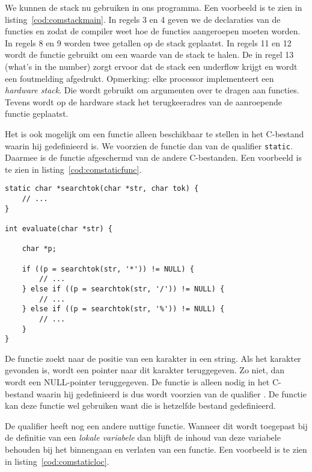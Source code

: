 We kunnen de stack nu gebruiken in ons programma. Een voorbeeld is te zien in listing~\ref{cod:comstackmain}. In regels 3 en 4 geven we de declaraties van de functies  en  zodat de compiler weet hoe de functies aangeroepen moeten worden. In regels 8 en 9 worden twee getallen op de stack geplaatst. In regels 11 en 12 wordt de functie  gebruikt om een waarde van de stack te halen. De  in regel 13 (what's in the number) zorgt ervoor dat de stack een underflow krijgt en wordt een foutmelding afgedrukt. Opmerking: elke processor implementeert een \textsl{hardware stack}. Die wordt gebruikt om argumenten over te dragen aan functies. Tevens wordt op de hardware stack het terugkeeradres van de aanroepende functie geplaatst.

Het is ook mogelijk om een functie alleen beschikbaar te stellen in het C-bestand waarin hij gedefinieerd is. We voorzien de functie dan van de qualifier \texttt{static}. Daarmee is de functie afgeschermd van de andere C-bestanden. Een voorbeeld is te zien in listing~\ref{cod:comstaticfunc}.

\begin{lstlisting}[caption=Gebruik van een static globale variabele.,label=cod:comstaticfunc]
static char *searchtok(char *str, char tok) {
    // ...
}

int evaluate(char *str) {
    
    char *p;
    
    if ((p = searchtok(str, '*')) != NULL) {
        // ...
    } else if ((p = searchtok(str, '/')) != NULL) {
        // ...
    } else if ((p = searchtok(str, '%')) != NULL) {
        // ...
    }
}
\end{lstlisting}

De functie  zoekt naar de positie van een karakter in een string. Als het karakter gevonden is, wordt een pointer naar dit karakter teruggegeven. Zo niet, dan wordt een NULL-pointer teruggegeven.  De functie is alleen nodig in het C-bestand waarin hij gedefinieerd is dus wordt  voorzien van de qualifier . De functie  kan deze functie wel gebruiken want die is hetzelfde bestand gedefinieerd.

De qualifier  heeft nog een andere nuttige functie. Wanneer dit wordt toegepast bij de definitie van een \textsl{lokale variabele} dan blijft de inhoud van deze variabele behouden bij het binnengaan en verlaten van een functie. Een voorbeeld is te zien in listing~\ref{cod:comstaticloc}.

